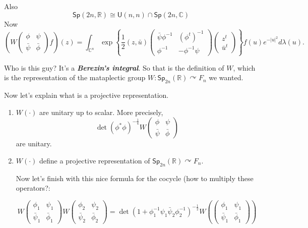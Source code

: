 Also
$$\mathsf{Sp}(2n,\mathbb{R})\cong
\mathsf{U}(n,n) \cap
\mathsf{Sp}(2n,\mathbb{C})$$
Now
$$\left(W\begin{pmatrix}
\phi&\psi\\\bar{\psi} &\bar{\phi}
\end{pmatrix}
f\right)(z)=\int_{\mathbb{C}^{n}}
\operatorname{exp}
\left\{ \frac{1}{2}(z,\bar{u}
)\begin{pmatrix} \bar{\psi}
\phi^{-1}&(\phi^t)^{-1}\\\phi^{-1}&-\phi^{-1}
\psi
\end{pmatrix} \begin{pmatrix} z^t\\\bar{u} ^t
\end{pmatrix}  \right\} f(u)e^{-|u|^2}d
\lambda(u).$$

Who is this guy? It's a {\it\bf Berezin's
integral}. So that is the definition of $W$,
which is the representation of the
mataplectic group
$W:\mathsf{Sp}_{2n}(\mathbb{R})
\curvearrowright
F_n$ we wanted.

Now let's explain what is a projective
representation.

\begin{theorem}
\label{theorem-erdnigor-projective}
\begin{enumerate}

\item
$W(\cdot )$ are unitary up to scalar. More
precisely,
$$\det (\phi^*\phi)^{-\frac{1}{4}} W
\begin{pmatrix} \phi&\psi\\\bar{\psi}
&\bar{\phi}  \end{pmatrix}$$
are unitary.

\item $W(\cdot )$ define a projective
representation of
$\mathsf{Sp}_{2n}(\mathbb{R})\curvearrowright
F_n$.

Now let's finish with this nice formula for
the cocycle (how to multiply these
operators?:

$$W \begin{pmatrix} \phi_1
&\psi_1\\\bar{\psi}_1 &\bar{\phi}_1
\end{pmatrix}W \begin{pmatrix}
\phi_2&\psi_2\\\bar{\psi}_2&\bar{\phi}_2
\end{pmatrix} =\det
(1+\phi_1^{-1}\psi_1\bar{\psi}_2\phi_2^{-1})
^{-\frac{1}{2}}
W\left( \begin{pmatrix}
\phi_1&\psi_1\\\bar{\psi}_1&\bar{\phi}_1
\end{pmatrix}  \right)$$
\end{enumerate}
\end{theorem}


